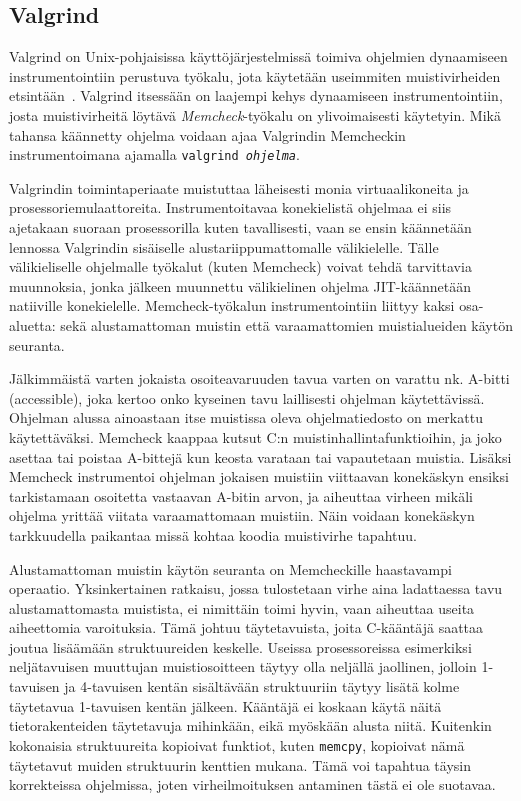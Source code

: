 \subsection{Valgrind}

Valgrind on Unix-pohjaisissa käyttöjärjestelmissä toimiva ohjelmien dynaamiseen instrumentointiin
perustuva työkalu, jota käytetään useimmiten muistivirheiden etsintään~\cite{Valgrind}.
Valgrind itsessään on laajempi kehys dynaamiseen instrumentointiin,
josta muistivirheitä löytävä \emph{Memcheck}-työkalu on ylivoimaisesti käytetyin.
Mikä tahansa käännetty ohjelma voidaan ajaa Valgrindin Memcheckin instrumentoimana ajamalla
\texttt{valgrind \emph{ohjelma}}.

Valgrindin toimintaperiaate muistuttaa läheisesti monia virtuaalikoneita ja prosessoriemulaattoreita.
Instrumentoitavaa konekielistä ohjelmaa ei siis ajetakaan suoraan prosessorilla kuten tavallisesti,
vaan se ensin käännetään lennossa Valgrindin sisäiselle alustariippumattomalle välikielelle.
Tälle välikieliselle ohjelmalle työkalut (kuten Memcheck) voivat tehdä tarvittavia muunnoksia,
jonka jälkeen muunnettu välikielinen ohjelma JIT-käännetään natiiville konekielelle.
Memcheck-työkalun instrumentointiin liittyy kaksi osa-aluetta:
sekä alustamattoman muistin että varaamattomien muistialueiden käytön seuranta.

Jälkimmäistä varten jokaista osoiteavaruuden tavua varten on varattu nk. A-bitti (accessible),
joka kertoo onko kyseinen tavu laillisesti ohjelman käytettävissä.
Ohjelman alussa ainoastaan itse muistissa oleva ohjelmatiedosto on merkattu käytettäväksi.
Memcheck kaappaa kutsut C:n muistinhallintafunktioihin,
ja joko asettaa tai poistaa A-bittejä kun keosta varataan tai vapautetaan muistia.
Lisäksi Memcheck instrumentoi ohjelman jokaisen muistiin viittaavan konekäskyn
ensiksi tarkistamaan osoitetta vastaavan A-bitin arvon,
ja aiheuttaa virheen mikäli ohjelma yrittää viitata varaamattomaan muistiin.
Näin voidaan konekäskyn tarkkuudella paikantaa missä kohtaa koodia
muistivirhe tapahtuu.

Alustamattoman muistin käytön seuranta on Memcheckille haastavampi operaatio.
Yksinkertainen ratkaisu, jossa tulostetaan virhe aina ladattaessa
tavu alustamattomasta muistista, ei nimittäin toimi hyvin, vaan aiheuttaa
useita aiheettomia varoituksia.
Tämä johtuu täytetavuista, joita C-kääntäjä saattaa joutua lisäämään struktuureiden keskelle.
Useissa prosessoreissa esimerkiksi neljätavuisen muuttujan muistiosoitteen täytyy olla neljällä jaollinen,
jolloin 1-tavuisen ja 4-tavuisen kentän sisältävään struktuuriin täytyy lisätä kolme täytetavua
1-tavuisen kentän jälkeen.
Kääntäjä ei koskaan käytä näitä tietorakenteiden täytetavuja mihinkään, eikä myöskään alusta niitä.
Kuitenkin kokonaisia struktuureita kopioivat funktiot, kuten \texttt{memcpy},
kopioivat nämä täytetavut muiden struktuurin kenttien mukana.
Tämä voi tapahtua täysin korrekteissa ohjelmissa,
joten virheilmoituksen antaminen tästä ei ole suotavaa.

